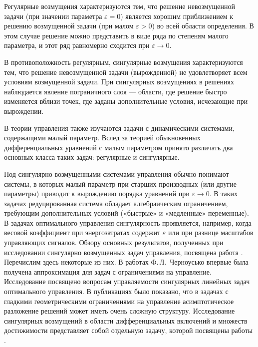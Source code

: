 \documentclass[../abstract.tex]{subfiles}
\begin{document}
Регулярные возмущения характеризуются тем, что решение невозмущенной задачи (при значении параметра $\varepsilon = 0$) является хорошим приближением к решению возмущенной задачи (при малом $\varepsilon > 0$) во всей области определения. 
В этом случае решение можно представить в виде ряда по степеням малого параметра, и этот ряд равномерно сходится при $\varepsilon \to 0$.

В противоположность регулярным, сингулярные возмущения характеризуются тем, что решение невозмущенной задачи (вырожденной) не удовлетворяет всем условиям возмущенной задачи. 
При сингулярных возмущениях в решениях наблюдается явление пограничного слоя --- области, где решение быстро изменяется вблизи точек, где заданы дополнительные условия, исчезающие при вырождении.

В теории управления также изучаются задачи с динамическими системами, содержащими малый параметр. 
Вслед за теорией обыкновенных дифференциальных уравнений с малым параметром принято различать два основных класса таких задач: регулярные и сингулярные. 

Под сингулярно возмущенными системами управления обычно понимают системы, в которых малый параметр при старших производных (или другие параметры) приводит к вырождению порядка уравнений при $\varepsilon\to0$. 
В таких задачах редуцированная система обладает алгебраическим ограничением, требующим дополнительных условий («быстрые» и «медленные» переменные). 
В задачах оптимального управления сингулярность проявляется, например, когда весовой коэффициент при энергозатратах содержит $\varepsilon$ или при разнице масштабов управляющих сигналов. 
Обзору основных результатов, полученных при исследовании сингулярно возмущенных задач управления, посвящена работа \cite{Dmitriev}.
Перечислим здесь некоторые из них. 
В работах Ф.\,Л.~Черноусько \cite{Chernousko1968, Chernousko1977} впервые была получена аппроксимация для задач с ограничениями на управление.
Исследование \cite{Kokotovic} посвящено вопросам управляемости сингулярных линейных задач оптимального управления.
В публикациях \cite{Ilyin1989, Ilyin1998} было показано, что в задачах с гладкими геометрическими ограничениями на управление асимптотическое разложение решений может иметь очень сложную структуру. 
Исследование сингулярных возмущений в области дифференциальных включений и множеств достижимости представляет собой отдельную задачу, которой посвящены работы \cite{FilippovaKurzhansky, Veliov, GONCHAROVAOVSEEVICH}.
\end{document}

